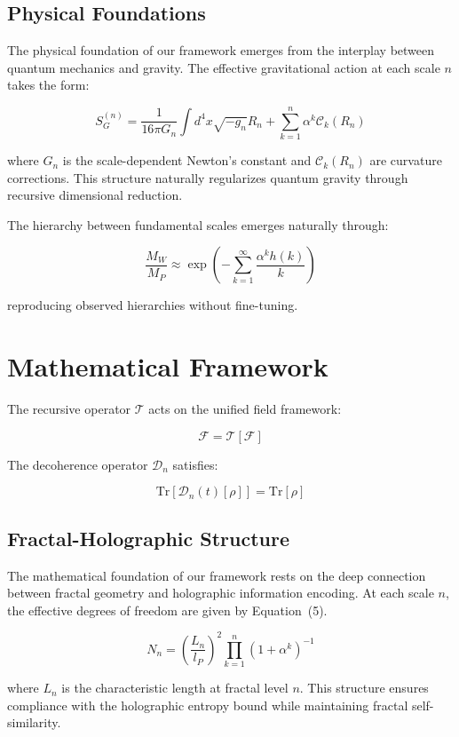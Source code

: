 \documentclass[12pt]{article}
\begin{document}
\subsection{Physical Foundations}

The physical foundation of our framework emerges from the interplay between quantum mechanics and gravity. The effective gravitational action at each scale $n$ takes the form:

\[
S_G^{(n)} = \frac{1}{16\pi G_n} \int d^4x \sqrt{-g_n} R_n + \sum_{k=1}^n \alpha^k \mathcal{C}_k(R_n) \tag{4}
\]

where $G_n$ is the scale-dependent Newton's constant and $\mathcal{C}_k(R_n)$ are curvature corrections. This structure naturally regularizes quantum gravity through recursive dimensional reduction.

The hierarchy between fundamental scales emerges naturally through:

\[
\frac{M_W}{M_P} \approx \exp\left(-\sum_{k=1}^{\infty} \frac{\alpha^k h(k)}{k}\right)
\]

reproducing observed hierarchies without fine-tuning.

\section{Mathematical Framework}

The recursive operator $\mathcal{T}$ acts on the unified field framework:

\[
\mathcal{F} = \mathcal{T}[\mathcal{F}]
\]

The decoherence operator $\mathcal{D}_n$ satisfies:

\[
\text{Tr}[\mathcal{D}_n(t)[\rho]] = \text{Tr}[\rho]
\]

\subsection{Fractal-Holographic Structure}

The mathematical foundation of our framework rests on the deep connection between fractal geometry and holographic information encoding. At each scale $n$, the effective degrees of freedom are given by Equation~(5).

\begin{equation}
N_n = \left(\frac{L_n}{l_P}\right)^2 \prod_{k=1}^n (1 + \alpha^k)^{-1}
\end{equation}

where $L_n$ is the characteristic length at fractal level $n$. This structure ensures compliance with the holographic entropy bound while maintaining fractal self-similarity.
\end{document}
